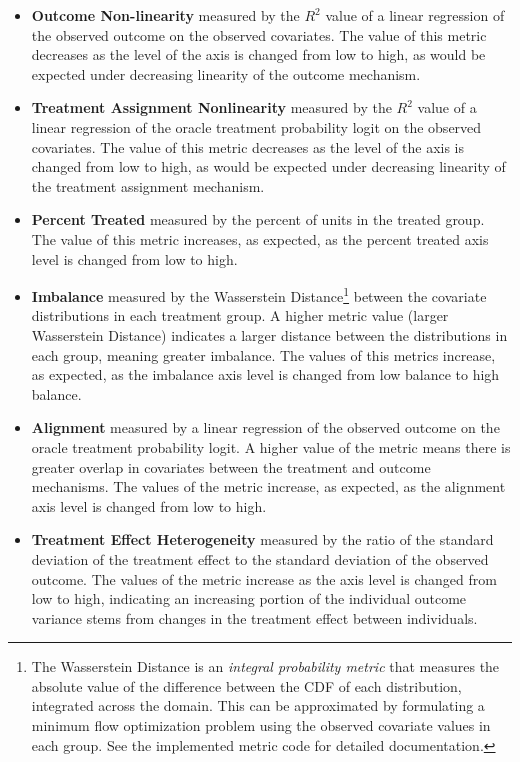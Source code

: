 \documentclass[../main.tex]{subfiles}
\begin{document}
\begin{itemize}
    \item \textbf{Outcome Non-linearity} measured by the $R^2$ value of a linear regression of the observed outcome on the observed covariates. The value of this metric decreases as the level of the axis is changed from low to high, as would be expected under decreasing linearity of the outcome mechanism.
    
    \item \textbf{Treatment Assignment Nonlinearity} measured by the $R^2$ value of a linear regression of the oracle treatment probability logit on the observed covariates. The value of this metric decreases as the level of the axis is changed from low to high, as would be expected under decreasing linearity of the treatment assignment mechanism.
    
    \item \textbf{Percent Treated} measured by the percent of units in the treated group. The value of this metric increases, as expected, as the percent treated axis level is changed from low to high.
    
    \item \textbf{Imbalance} measured by the Wasserstein Distance\footnote{The Wasserstein Distance is an \textit{integral probability metric} that measures the absolute value of the difference between the CDF of each distribution, integrated across the domain. This can be approximated by formulating a minimum flow optimization problem using the observed covariate values in each group. See the implemented metric code for detailed documentation.} between the covariate distributions in each treatment group. A higher metric value (larger Wasserstein Distance) indicates a larger distance between the distributions in each group, meaning greater imbalance. The values of this metrics increase, as expected, as the imbalance axis level is changed from low balance to high balance. 
    
    \item \textbf{Alignment} measured by a linear regression of the observed outcome on the oracle treatment probability logit. A higher value of the metric means there is greater overlap in covariates between the treatment and outcome mechanisms. The values of the metric increase, as expected, as the alignment axis level is changed from low to high.
    
    \item \textbf{Treatment Effect Heterogeneity} measured by the ratio of the standard deviation of the treatment effect to the standard deviation of the observed outcome. The values of the metric increase as the axis level is changed from low to high, indicating an increasing portion of the individual outcome variance stems from changes in the treatment effect between individuals.
\end{itemize}
\end{document}
